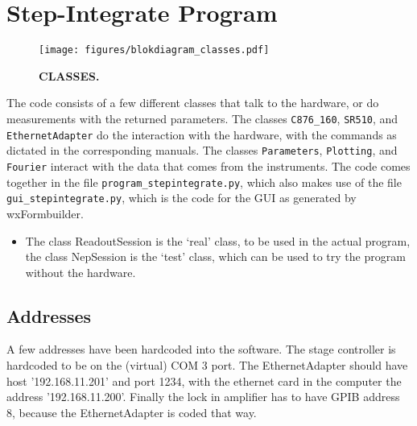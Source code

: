 
\section{Step-Integrate Program}


\begin{figure}
 \begin{center}
  \texttt{[image: figures/blokdiagram\_classes.pdf]}
  \caption{\textbf{CLASSES.}}
  \label{fig:blokdiagram}
 \end{center}
\end{figure}

The code consists of a few different classes that talk to the hardware, or do measurements with the returned parameters. The classes \verb!C876_160!, \verb!SR510!, and \verb!EthernetAdapter! do the interaction with the hardware, with the commands as dictated in the corresponding manuals. The classes \verb!Parameters!, \verb!Plotting!, and \verb!Fourier! interact with the data that comes from the instruments. The code comes together in the file \verb!program_stepintegrate.py!, which also makes use of the file \verb!gui_stepintegrate.py!, which is the code for the GUI as generated by wxFormbuilder.

\begin{itemize}
\item The class ReadoutSession is the `real' class, to be used in the actual program, the class NepSession is the `test' class, which can be used to try the program without the hardware.
\end{itemize}

\subsection{Addresses}
A few addresses have been hardcoded into the software. The stage controller is hardcoded to be on the (virtual) COM 3 port. The EthernetAdapter should have host '192.168.11.201' and port 1234, with the ethernet card in the computer the address '192.168.11.200'. Finally the lock in amplifier has to have GPIB address 8, because the EthernetAdapter is coded that way.

